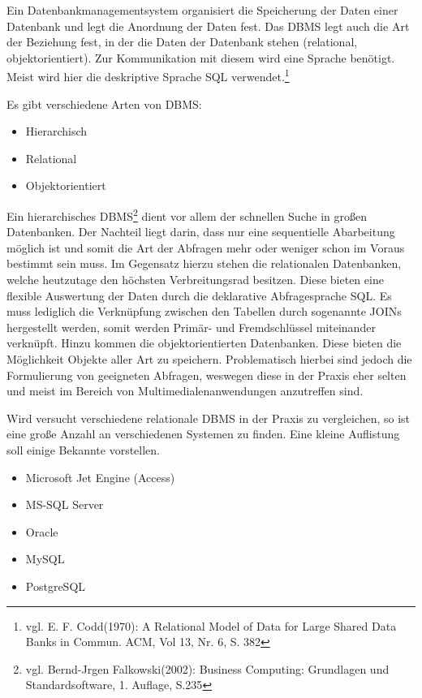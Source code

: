 Ein Datenbankmanagementsystem organisiert die Speicherung der Daten einer Datenbank und legt die Anordnung der Daten fest.
Das DBMS legt auch die Art der Beziehung fest, in der die Daten der Datenbank stehen (relational, objektorientiert).
Zur Kommunikation mit diesem wird eine Sprache benötigt. Meist wird hier die deskriptive Sprache SQL verwendet.\footnote{vgl. E. F. Codd(1970): A Relational Model of Data for Large Shared Data Banks in Commun. ACM, Vol 13, Nr. 6, S. 382}


Es gibt verschiedene Arten von DBMS:

\begin{itemize}
\item Hierarchisch
\item Relational
\item Objektorientiert
\end{itemize}

Ein hierarchisches DBMS\footnote{vgl. Bernd-Jrgen Falkowski(2002): Business Computing: Grundlagen und Standardsoftware, 1. Auflage, S.235} dient vor allem der schnellen Suche in großen Datenbanken.
Der Nachteil liegt darin, dass nur eine sequentielle Abarbeitung möglich ist und somit die Art der Abfragen mehr oder weniger schon im Voraus bestimmt sein muss.
Im Gegensatz hierzu stehen die relationalen Datenbanken, welche heutzutage den höchsten Verbreitungsrad besitzen.
Diese bieten eine flexible Auswertung der Daten durch die deklarative Abfragesprache SQL.
Es muss lediglich die Verknüpfung zwischen den Tabellen durch sogenannte JOINs hergestellt werden, somit werden Primär- und Fremdschlüssel miteinander verknüpft.
Hinzu kommen die objektorientierten Datenbanken. Diese bieten die Möglichkeit Objekte aller Art zu speichern.
Problematisch hierbei sind jedoch die Formulierung von geeigneten Abfragen, weswegen diese in der Praxis eher selten und meist im Bereich von Multimedialenanwendungen anzutreffen sind.%

Wird versucht verschiedene relationale DBMS in der Praxis zu vergleichen, so ist eine große Anzahl an verschiedenen Systemen zu finden.
Eine kleine Auflistung soll einige Bekannte vorstellen.

\begin{itemize}
\item Microsoft Jet Engine (Access)
\item MS-SQL Server
\item Oracle
\item MySQL
\item PostgreSQL
\end{itemize}

